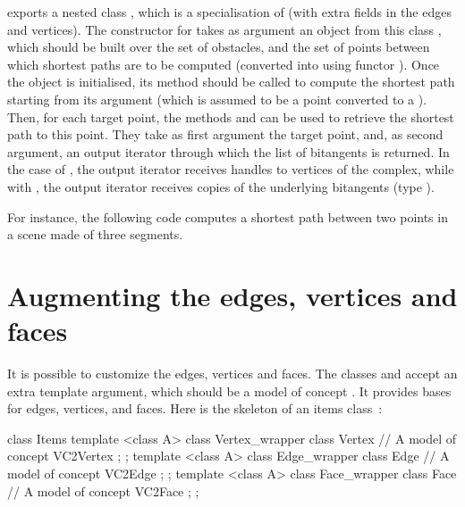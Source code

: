  exports a nested class
, which is a specialisation of
 (with extra fields in the edges
and vertices). The constructor for 
takes as argument an object from this class ,
which should be built over the set of obstacles, and the set of points
between which shortest paths are to be computed (converted into
 using functor
). Once the object is
initialised, its method 
should be called to compute the shortest path starting from its argument
(which is assumed to be a point converted to a
). Then, for each target point, the methods
 and  can be used to
retrieve the shortest path to this point. They take as first argument the
target point, and, as second argument, an output iterator through which the
list of bitangents is returned. In the case of , the
output iterator receives handles to vertices of the complex, while with
, the output iterator receives copies of the
underlying bitangents (type ).

For instance, the following code computes a shortest path between two
points in a scene made of three segments.


\section{Augmenting the edges, vertices and faces}

It is possible to customize the edges, vertices and faces. The classes
 and  accept an extra
template argument, which should be a model of concept . It
provides bases for edges, vertices, and faces. Here is the skeleton of an
items class~:

\begin{ccExampleCode}
class Items {
  template <class A> class Vertex_wrapper {
    class Vertex {
      // A model of concept VC2Vertex
    };
  };
  template <class A> class Edge_wrapper {
    class Edge {
      // A model of concept VC2Edge
    };
  };
  template <class A> class Face_wrapper {
    class Face {
      // A model of concept VC2Face
    };
  };
}
\end{ccExampleCode}

